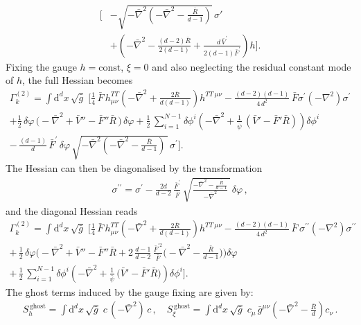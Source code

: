\documentclass[11pt]{book} %
\newcommand{\rad}{\psi}
\numberwithin{equation}{chapter}
\begin{document}
{\begin{appendices}
\begin{align}
  \bigg[
    &- \sqrt{-\bar{\nabla}^2\left(-\bar{\nabla}^2-\frac{\bar{R}}{d-1}\right)} \, \sigma' \nonumber \\
    &+
    \left(
      -\bar{\nabla}^2
      -\frac{(d-2) \bar{R}}{2(d-1)}
      +\frac{d\,\bar{V}^{\prime}}{2(d-1)\bar{F}^{\prime}}
    \right)
    h
  \bigg] .
\end{align}
Fixing the gauge $h = \text{const}$, $\xi=0$ and also neglecting the residual constant mode of $h$,
the full Hessian becomes
\begin{align}
  \Gamma_k^{(2)} = \int \mathrm d^d x \, \sqrt{\bar{g}} \;
  \Bigg[
    \frac{1}{4} \, \bar{F} \, h^{TT}_{\mu\nu} \left( -\bar{\nabla}^2 + \frac{2 \bar{R}}{d(d-1)} \right) h^{TT\,\mu\nu}
    - \frac{(d-2)(d-1)}{4\,d^2} \, \bar{F} \sigma^{\prime} (-\nabla^2) \sigma^{\prime}
    \nonumber\\
    +\frac{1}{2} \, \delta\varphi \, \Big( -\bar\nabla^2 + \bar V'' - \bar F''\bar{R} \, \Big) \, \delta\varphi
    +\frac{1}{2} \, \sum_{i=1}^{N-1} \delta\phi^i
    \left(-\bar\nabla^2
    +\frac{1}{\bar\rad} \, (\bar V'-\bar F'\bar{R})\right) \delta\phi^i
    \nonumber \\
    - \,   \frac{(d-1)}{d} \, \bar{F}^{\prime} \, \delta\varphi \,
    \sqrt{-\bar{\nabla}^2\left(-\bar{\nabla}^2-\frac{\bar{R}}{d-1}\right) \, } \, \sigma^{\prime}
  \Bigg] .
  \label{oldHessian}
\end{align}
The Hessian can then be diagonalised by the transformation
\begin{align}
  \sigma^{\prime\prime} = \sigma^{\prime}
  -\frac{2d}{d-2} \, \frac{\bar{F}^{\prime}}{\bar{F}}  \, \sqrt{\frac{-\bar{\nabla}^2-\frac{\bar{R}}{d-1}}{-\bar{\nabla}^2} \, } \, \delta\varphi\,,
\end{align}
and the diagonal Hessian reads
\begin{align}
  \Gamma_k^{(2)} = \int \mathrm{d}^d x \, \sqrt{\bar{g}} \;
  \Bigg[
    \frac{1}{4}\,\bar{F}\, h^{TT}_{\mu\nu} \left( -\bar{\nabla}^2
    + \frac{2 \bar{R}}{d(d-1)} \right) h^{TT\,\mu\nu}
    - \frac{(d-2)(d-1)}{4\,d^2} \, \bar{F} \, \sigma^{\prime\prime} (-\nabla^2) \sigma^{\prime\prime}
    \nonumber\\
    +\, \frac{1}{2} \, \delta\varphi
    \bigg(
      - \bar\nabla^2 + \bar V'' - \bar F'' \bar R
      + 2 \, \frac{d-1}{d-2} \, \frac{\bar{F}^{\prime 2}}{\bar{F}}
      \bigg(
        -\bar{\nabla}^2 - \frac{\bar{R}}{d-1}
      \bigg)
    \bigg) \delta\varphi \nonumber \\
    +\,\frac{1}{2} \, \sum_{i=1}^{N-1} \delta\phi^i
    \left( -\bar\nabla^2
    +\frac{1}{\bar\rad} \, \big( \bar V'-\bar F'\bar{R} \big)\right)\delta\phi^i
  \Bigg] .
  \label{hessfinal}
\end{align}
The ghost terms induced by the gauge fixing are given by:
\begin{align}
  S^{\,\mathrm{ghost}}_{h} = \int \mathrm d^dx \, \sqrt{\bar g} \; c \, (-\bar\nabla^2) \, c \,,
  \quad
  S^{\,\mathrm{ghost}}_{\xi} = \int \mathrm d^dx \, \sqrt{\bar g} \;  c_\mu \, \bar g^{\mu\nu}
  \left(-\bar\nabla^2-\frac{\bar R}{d}\right) c_\nu \,.
  \label{ghosts}
\end{align}



\end{appendices}}
\end{document}
